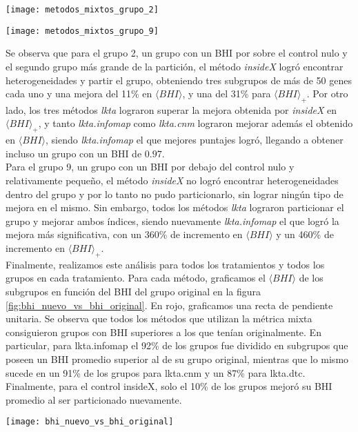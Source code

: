 \begin{center}
\texttt{[image: metodos\_mixtos\_grupo\_2]}
\label{fig:metodos_mixtos_grupo_2}
\end{center}
\begin{center}
\texttt{[image: metodos\_mixtos\_grupo\_9]}
\label{fig:metodos_mixtos_grupo_9}
\end{center}
Se observa que para el grupo 2, un grupo con un BHI por sobre el control nulo y el segundo grupo más grande de la partición, el método \textit{insideX} logró encontrar heterogeneidades y partir el grupo, obteniendo tres subgrupos de más de 50 genes cada uno y una mejora del 11\% en $\langle BHI \rangle$, y una del 31\% para $\langle BHI \rangle _{+}$. Por otro lado, los tres métodos \textit{lkta} lograron superar la mejora obtenida por \textit{insideX} en $\langle BHI \rangle _{+}$, y tanto \textit{lkta.infomap} como \textit{lkta.cnm} lograron mejorar además el obtenido en $\langle BHI \rangle$, siendo \textit{lkta.infomap} el que mejores puntajes logró, llegando a obtener incluso un grupo con un BHI de $0.97$.\\
Para el grupo 9, un grupo con un BHI por debajo del control nulo y relativamente pequeño, el método \textit{insideX} no logró encontrar heterogeneidades dentro del grupo y por lo tanto no pudo particionarlo, sin lograr ningún tipo de mejora en el mismo. Sin embargo, todos los métodos \textit{lkta} lograron particionar el grupo y mejorar ambos índices, siendo nuevamente \textit{lkta.infomap} el que logró la mejora más significativa, con un 360\% de incremento en $\langle BHI \rangle$ y un 460\% de incremento en $\langle BHI \rangle _{+}$.\\
Finalmente, realizamos este análisis para todos los tratamientos y todos los grupos en cada tratamiento. Para cada método, graficamos el $\langle BHI \rangle$ de los subgrupos en función del BHI del grupo original en la figura \ref{fig:bhi_nuevo_vs_bhi_original}. En rojo, graficamos una recta de pendiente unitaria. Se observa que todos los métodos que utilizan la métrica mixta consiguieron grupos con BHI superiores a los que tenían originalmente. En particular, para lkta.infomap el 92\% de los grupos fue dividido en subgrupos que poseen un BHI promedio superior al de su grupo original, mientras que lo mismo sucede en un 91\% de los grupos para lkta.cnm y un 87\% para lkta.dtc. Finalmente, para el control insideX, solo el 10\% de los grupos mejoró su BHI promedio al ser particionado nuevamente.
\begin{center}
\texttt{[image: bhi\_nuevo\_vs\_bhi\_original]}
\label{fig:bhi_nuevo_vs_bhi_original}
\end{center}
